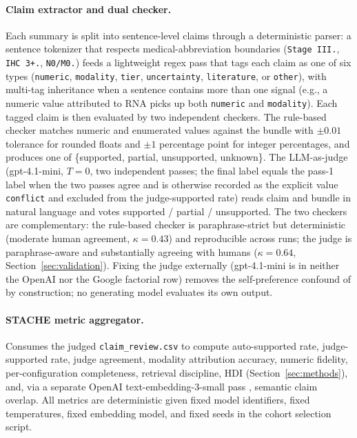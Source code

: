 \documentclass[11pt]{article}
\begin{document}
\paragraph{Claim extractor and dual checker.}
Each summary is split into sentence-level claims through a deterministic parser: a sentence tokenizer that respects medical-abbreviation boundaries (\texttt{Stage III.}, \texttt{IHC 3+.}, \texttt{N0/M0.}) feeds a lightweight regex pass that tags each claim as one of six types (\texttt{numeric}, \texttt{modality}, \texttt{tier}, \texttt{uncertainty}, \texttt{literature}, or \texttt{other}), with multi-tag inheritance when a sentence contains more than one signal (e.g., a numeric value attributed to RNA picks up both \texttt{numeric} and \texttt{modality}). Each tagged claim is then evaluated by two independent checkers. The rule-based checker matches numeric and enumerated values against the bundle with $\pm 0.01$ tolerance for rounded floats and $\pm 1$ percentage point for integer percentages, and produces one of \{supported, partial, unsupported, unknown\}. The LLM-as-judge (gpt-4.1-mini, $T{=}0$, two independent passes; the final label equals the pass-1 label when the two passes agree and is otherwise recorded as the explicit value \texttt{conflict} and excluded from the judge-supported rate) reads claim and bundle in natural language and votes supported / partial / unsupported. The two checkers are complementary: the rule-based checker is paraphrase-strict but deterministic (moderate human agreement, $\kappa{=}0.43$) and reproducible across runs; the judge is paraphrase-aware and substantially agreeing with humans ($\kappa{=}0.64$, Section~\ref{sec:validation}). Fixing the judge externally (gpt-4.1-mini is in neither the OpenAI nor the Google factorial row) removes the self-preference confound of \citet{panickssery2024llm} by construction; no generating model evaluates its own output.

\paragraph{STACHE metric aggregator.}
Consumes the judged \texttt{claim\_review.csv} to compute auto-supported rate, judge-supported rate, judge agreement, modality attribution accuracy, numeric fidelity, per-configuration completeness, retrieval discipline, HDI (Section~\ref{sec:methods}), and, via a separate OpenAI text-embedding-3-small pass \citep{openai2024embeddings}, semantic claim overlap. All metrics are deterministic given fixed model identifiers, fixed temperatures, fixed embedding model, and fixed seeds in the cohort selection script.
\end{document}
